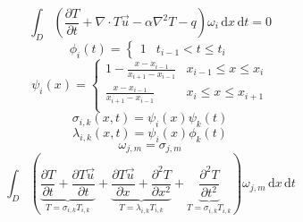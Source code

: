 \documentclass[12pt]{article}
\newcommand{\diff}[0]{\, \mathrm{d}}
\begin{document}
\[\int_D (\frac{\partial T}{\partial t} + \nabla\cdot T \vec{u}-\alpha\nabla^2 T - q)\omega_i\diff x \diff t = 0\]
\[\phi_i(t) = 
\begin{cases}
1 & t_{i-1} < t \leq t_i
\end{cases}\]
\[\psi_i(x) = 
\begin{cases}
1-\frac{x-x_{i-1}}{x_{i+1}-x_{i-1}} & x_{i-1} \leq x \leq x_i\\
\frac{x-x_{i-1}}{x_{i+1}-x_{i-1}} & x_i \leq x \leq x_{i+1}\\
\end{cases}\]
\[\sigma_{i,k}(x,t) = \psi_i(x)\psi_k(t)\]
\[\lambda_{i,k}(x,t) = \psi_i(x)\phi_k(t)\]
\[\omega_{j,m} = \sigma_{j,m}\]
\[\int_D (\underbrace{\frac{\partial T}{\partial t} + \frac{\partial{T\vec{u}}}{\partial t}}_{T=\sigma_{i,k} T_{i,k}}+\underbrace{\frac{\partial T\vec{u}}{\partial{x}}+\frac{\partial^2 T}{\partial x^2}}_{T=\lambda_{i,k} T_{i,k}}+\underbrace{\frac{\partial^2 T}{\partial t^2}}_{T = \sigma_{i,k} T_{i,k}})\omega_{j,m} \diff x \diff t\]
\end{document}

